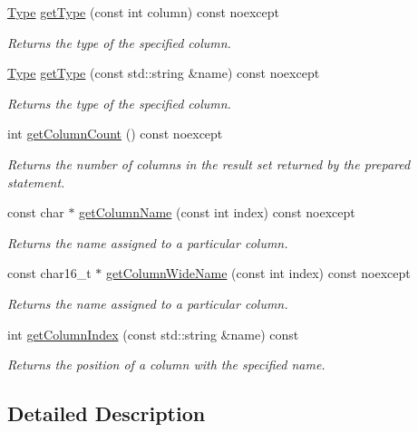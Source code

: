 \begin{DoxyCompactItemize}
\hyperlink{a00038_ad7a8ff5f375eca25eb6e3a51d746a04c}{Type} \hyperlink{a00010_a0450ea397b1a9d8dd636b82c8757d33e}{get\-Type} (const int column) const noexcept
\begin{DoxyCompactList}\small\item\em Returns the type of the specified column. \end{DoxyCompactList}\item 
\hyperlink{a00038_ad7a8ff5f375eca25eb6e3a51d746a04c}{Type} \hyperlink{a00010_ae4f049a45c69b9e1bf6db4cf63699f64}{get\-Type} (const std\-::string \&name) const noexcept
\begin{DoxyCompactList}\small\item\em Returns the type of the specified column. \end{DoxyCompactList}\item 
int \hyperlink{a00010_a9e6b9d0d99dea8964a34a3c2f08e99bc}{get\-Column\-Count} () const noexcept
\begin{DoxyCompactList}\small\item\em Returns the number of columns in the result set returned by the prepared statement. \end{DoxyCompactList}\item 
const char $\ast$ \hyperlink{a00010_a5004961d65336631d45de411ffb87cd5}{get\-Column\-Name} (const int index) const noexcept
\begin{DoxyCompactList}\small\item\em Returns the name assigned to a particular column. \end{DoxyCompactList}\item 
const char16\-\_\-t $\ast$ \hyperlink{a00010_af46d30137ad020b1e22ad703810ea002}{get\-Column\-Wide\-Name} (const int index) const noexcept
\begin{DoxyCompactList}\small\item\em Returns the name assigned to a particular column. \end{DoxyCompactList}\item 
int \hyperlink{a00010_ae7eaa050a97cda893e9737bca416f0cb}{get\-Column\-Index} (const std\-::string \&name) const 
\begin{DoxyCompactList}\small\item\em Returns the position of a column with the specified name. \end{DoxyCompactList}\end{DoxyCompactItemize}


\subsection{Detailed Description}
